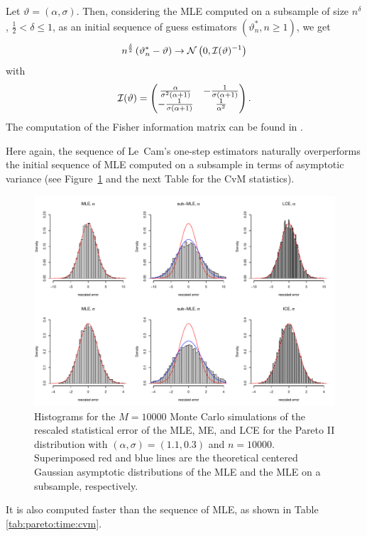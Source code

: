 Let $\vartheta=(\alpha,\sigma)$. Then, considering the MLE computed on a subsample of size $n^\delta$, $\frac12 < \delta \leq 1$, as an initial sequence of guess estimators $(\vartheta_n^*, n \geq 1)$,  we get
$$ n^{\frac{\delta}{2}} \left( \vartheta^*_n-\vartheta \right) \rightarrow {\cal N}\left(0,{\cal I}(\vartheta)^{-1}\right)$$
with
$${\cal I}(\vartheta) = \begin{pmatrix} \frac{\alpha}{\sigma^2(\alpha+1)} & -\frac{1}{\sigma(\alpha+1)} \\
 -\frac{1}{\sigma(\alpha+1)} & \frac{1}{\alpha^2}\end{pmatrix}.$$
The computation of the Fisher information matrix can be found in \cite{B2003}.

Here again, the sequence of Le~Cam's one-step estimators naturally overperforms the initial sequence of MLE computed on a subsample in terms of asymptotic variance (see Figure~\ref{fig:pareto} and the next Table for the CvM statistics).

\begin{figure}[ht]
\centering
\includegraphics[width=\textwidth]{fig-Pareto.pdf}
\caption{Histograms for the $M=10000$ Monte Carlo simulations of the rescaled statistical error of the MLE, ME, and LCE for the Pareto II distribution with $(\alpha,\sigma)=(1.1,0.3)$ and $n=10000$. Superimposed red and blue lines are the theoretical centered Gaussian asymptotic distributions of the MLE and the MLE on a subsample, respectively.}\label{fig:pareto}
\end{figure}

It is also computed faster than the sequence of MLE, as shown in Table \ref{tab:pareto:time:cvm}.

